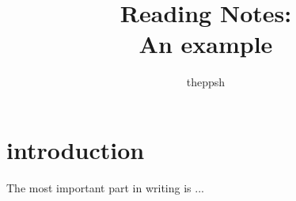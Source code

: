 \documentclass[a4paper,4pt]{article}
\author {theppsh}
\title {Reading Notes:\\An example}
\begin{document}
\maketitle
\section{introduction}
The most important part in writing is ...
\end{document}
